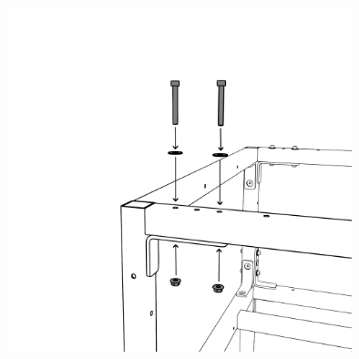 \vspace{1em}

\begin{center}
    \includegraphics[height=10cm]{../images/_111_.png}
\end{center}

\vspace{0.7em}



